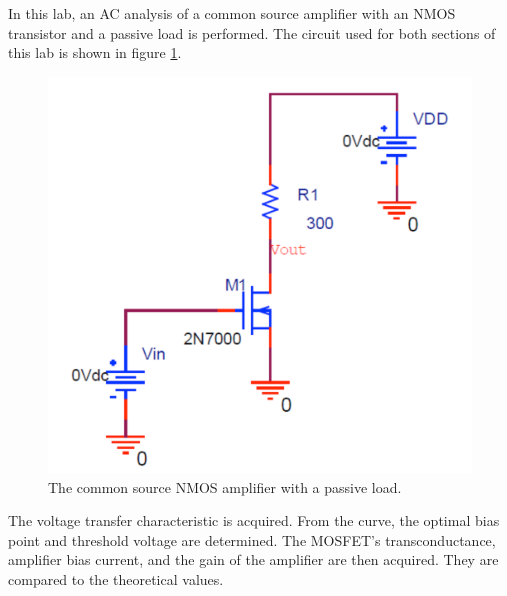 In this lab, an AC analysis of a common source amplifier with an NMOS transistor and a passive load is performed.
The circuit used for both sections of this lab is shown in figure \ref{fig:circuit}.

\FloatBarrier

\begin{figure}[h!]
	\centering
		\includegraphics[scale=0.75]{./images/circuit.png}
			\caption{The common source NMOS amplifier with a passive load.}
			\label{fig:circuit}
			\end{figure}

\FloatBarrier

The voltage transfer characteristic is acquired. From the curve, the optimal bias point and threshold voltage are determined. The MOSFET's transconductance, amplifier bias current, and the gain of the amplifier are then acquired. They are compared to the theoretical values.
